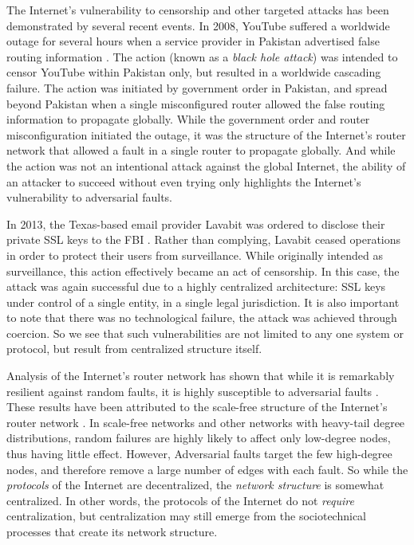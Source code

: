 \documentclass{sig-alternate-05-2015}
\begin{document}
The Internet's vulnerability to censorship and other targeted attacks
has been demonstrated by several recent events.
In 2008, YouTube suffered a worldwide outage for several hours
when a service provider in Pakistan advertised false routing information
\cite{hunter_pakistan_2008}.
The action (known as a {\em black hole attack}) was intended to censor YouTube
within Pakistan only, but resulted in a worldwide cascading failure.
The action was initiated by government order in Pakistan,
and spread beyond Pakistan when a single misconfigured router allowed the false
routing information to propagate globally.
While the government order and router misconfiguration initiated the outage,
it was the structure of the Internet's router network that allowed a fault in a
single router to propagate globally.
And while the action was not an intentional attack against the global Internet,
the ability of an attacker to succeed without even trying only highlights
the Internet's vulnerability to adversarial faults.

In 2013, the Texas-based email provider Lavabit was ordered to disclose
their private SSL keys to the FBI \cite{poulsen_edward_2013}.
Rather than complying,
Lavabit ceased operations
in order to protect their users from surveillance.
While originally intended as surveillance,
this action effectively became an act of censorship.
In this case, the attack was again successful due to a highly centralized
architecture:
SSL keys under control of a single entity, in a single legal jurisdiction.
It is also important to note that there was no technological failure,
the attack was achieved through coercion.
So we see that such vulnerabilities are not limited to any one system or protocol,
but result from centralized structure itself.

Analysis of the Internet's router network has shown that while it
is remarkably resilient against random faults,
it is highly susceptible to adversarial faults \cite{albert_error_2000}.
These results have been attributed to the scale-free structure of the Internet's
router network
\cite{barabasi_emergence_1999,barabasi_scale-free_2009}.
In scale-free networks and other networks with heavy-tail degree distributions,
random failures are highly likely to
affect only low-degree nodes, thus having
little effect.
However, Adversarial faults target the few high-degree nodes,
and therefore remove a large number of edges with each fault.
So while the {\em protocols} of the Internet are decentralized,
the {\em network structure} is somewhat centralized. 
In other words, the protocols of the Internet do not {\em require}
centralization, but centralization may still emerge from the sociotechnical
processes that create its network structure.
\end{document}
